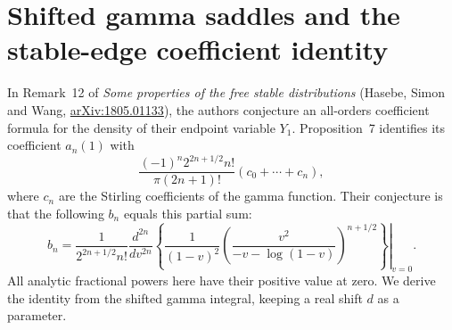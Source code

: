 \documentclass[11pt,a4paper]{article}
\numberwithin{equation}{section}
\begin{document}
\section{Shifted gamma saddles and the stable-edge coefficient identity}
\label{sec:stirling-edge}
In Remark~12 of \emph{Some properties of the free stable distributions}
(Hasebe, Simon and Wang, \href{https://arxiv.org/abs/1805.01133}{arXiv:1805.01133}),
the authors conjecture an all-orders coefficient formula for the density
of their endpoint variable $Y_1$. Proposition~7 identifies its
coefficient $a_n(1)$ with
\[
 \frac{(-1)^n2^{2n+1/2}n!}{\pi(2n+1)!}(c_0+\cdots+c_n),
\]
where $c_n$ are the Stirling coefficients of the gamma function.
Their conjecture is that the following $b_n$ equals this partial sum:
\[
 b_n=\frac{1}{2^{2n+1/2}n!}\left.\frac{d^{2n}}{dv^{2n}}
 \left\{\frac1{(1-v)^2}
 \left(\frac{v^2}{-v-\log(1-v)}\right)^{n+1/2}\right\}\right|_{v=0}.
\]
All analytic fractional powers here have their positive value at zero.
We derive the identity from the shifted gamma integral, keeping a
real shift $d$ as a parameter.
\end{document}
